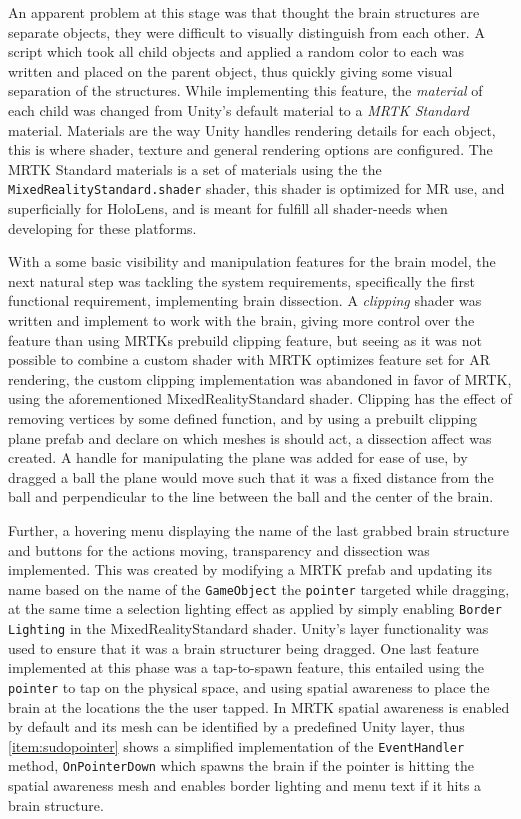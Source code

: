 An apparent problem at this stage was that thought the brain structures are separate objects, they were difficult to visually distinguish from each other. A script which took all child objects and applied a random color to each was written and placed on the parent object, thus quickly giving some visual separation of the structures. While implementing this feature, the \textit{material} of each child was changed from Unity's default material to a \textit{MRTK Standard} material. Materials are the way Unity handles rendering details for each object, this is where shader, texture and general rendering options are configured. The MRTK Standard materials is a set of materials using the the \texttt{MixedRealityStandard.shader} shader, this shader is optimized for MR use, and superficially for HoloLens, and is meant for fulfill all shader-needs when developing for these platforms. 


With a some basic visibility and manipulation features for the brain model, the next natural step was tackling the system requirements, specifically the first functional requirement, implementing brain dissection. A \textit{clipping} shader was written and implement to work with the brain, giving more control over the feature than using MRTKs prebuild clipping feature, but seeing as it was not possible to combine a custom shader with MRTK optimizes feature set for AR rendering, the custom clipping implementation was abandoned in favor of MRTK, using the aforementioned MixedRealityStandard shader. Clipping has the effect of removing vertices by some defined function, and by using a prebuilt clipping plane prefab and declare on which meshes is should act, a dissection affect was created. A handle for manipulating the plane was added for ease of use, by dragged a ball the plane would move such that it was a fixed distance from the ball and perpendicular to the line between the ball and the center of the brain. 


Further, a hovering menu displaying the name of the last grabbed brain structure and buttons for the actions moving, transparency and dissection was implemented. This was created by modifying a MRTK prefab and updating its name based on the name of the \texttt{GameObject} the \texttt{pointer} targeted while dragging, at the same time a selection lighting effect as applied by simply enabling \texttt{Border Lighting} in the MixedRealityStandard shader. Unity's layer functionality was used to ensure that it was a brain structurer being dragged. One last feature implemented at this phase was a tap-to-spawn feature, this entailed using the \texttt{pointer} to tap on the physical space, and using spatial awareness to place the brain at the locations the the user tapped. In MRTK spatial awareness is enabled by default and its mesh can be identified by a predefined Unity layer, thus \autoref{item:sudopointer} shows a simplified implementation of the \texttt{EventHandler} method, \texttt{OnPointerDown} which spawns the brain if the pointer is hitting the spatial awareness mesh and enables border lighting and menu text if it hits a brain structure.

